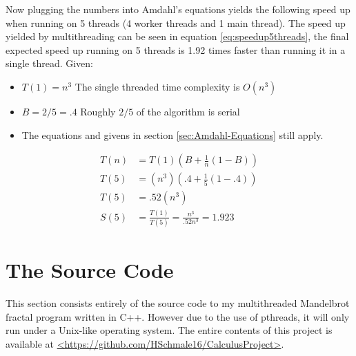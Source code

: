 \documentclass[11pt,oneside,letterpaper]{article}
\begin{document}
Now plugging the numbers into Amdahl's equations yields the following speed up
when running on 5 threads (4 worker threads and 1 main thread). The speed up
yielded by multithreading can be seen in equation \eqref{eq:speedup5threads},
the final expected speed up running on 5 threads is 1.92 times faster than running
it in a single thread.
Given:
\begin{itemize}
    \item $T(1) = n^3$ The single threaded time complexity is $O(n^3)$
    \item $B = 2/5 = .4$ Roughly $2/5$ of the algorithm is serial
    \item The equations and givens in section \ref{sec:Amdahl-Equations}
        still apply.
\end{itemize}

\begin{equation} \label{eq:speedup5threads}
    \begin{align*}
        T(n)&= T(1)(B + \frac{1}{n}(1-B))\\
        T(5)&= (n^3)(.4 + \frac{1}{5}(1-.4))\\
        T(5)&= .52(n^3)\\
        S(5)&= \frac{T(1)}{T(5)} = \frac{n^3}{.52n^3} = 1.923
    \end{align*}
\end{equation}

\section{The Source Code}
This section consists entirely of the source code to my multithreaded
Mandelbrot fractal program written in C++. However due to the use of
pthreads, it will only run under a Unix-like operating system. The 
entire contents of this project is available at 
\url{<https://github.com/HSchmale16/CalculusProject>}.

\end{document}
